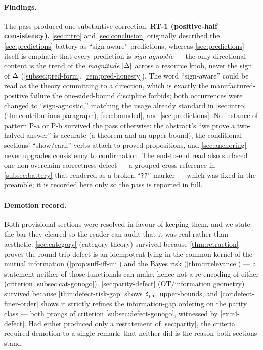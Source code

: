 \paragraph{Findings.}
The pass produced one substantive correction. \textbf{RT-1 (positive-half consistency).}
\cref{sec:intro} and \cref{sec:conclusion} originally described the
\cref{sec:predictions} battery as ``sign-aware'' predictions, whereas
\cref{sec:predictions} itself is emphatic that every prediction is
\emph{sign-agnostic} --- the only directional content is the trend of the
\emph{magnitude} $|\Delta|$ across a resource knob, never the sign of
$\Delta$ (\cref{subsec:pred-form}, \cref{rem:pred-honesty}). The word
``sign-aware'' could be read as the theory committing to a direction, which is
exactly the manufactured-positive failure the one-sided-bound discipline forbids; both occurrences were
changed to ``sign-agnostic,'' matching the usage already standard in
\cref{sec:intro} (the contributions paragraph), \cref{sec:bounded}, and
\cref{sec:predictions}. No instance of pattern P-a or P-b survived the pass
otherwise: the abstract's ``we prove a two-halved answer'' is accurate (a
theorem and an upper bound), the conditional sections' ``show/earn'' verbs attach to
proved propositions, and \cref{sec:anchoring} never upgrades consistency to
confirmation. The end-to-end read also surfaced one non-overclaim correctness
defect --- a grouped cross-reference in \cref{subsec:battery} that rendered as a
broken ``\texttt{??}'' marker --- which was fixed in the preamble; it is recorded
here only so the pass is reported in full.

\paragraph{Demotion record.}
Both provisional sections were resolved in favour of keeping them, and we state
the bar they cleared so the reader can audit that it was real rather than
aesthetic. \cref{sec:category} (category theory) survived because
\cref{thm:retraction} proves the round-trip defect is an idempotent lying in the
common kernel of the mutual information (\cref{prop:suff-iff-mi}) and the Bayes
risk (\cref{thm:irrelevance}) --- a statement neither of those functionals can
make, hence not a re-encoding of either (criterion \cref{subsec:cat-gonogo}).
\cref{sec:parity-defect} (OT/information geometry) survived because
\cref{thm:defect-risk-gap} shows $\delta_{\mathrm{par}}$ upper-bounds, and
\cref{cor:defect-finer-order} shows it strictly refines the information-gap
ordering on the parity class --- both prongs of criterion
\cref{subsec:defect-gonogo}, witnessed by \cref{ex:r4-defect}.
Had either produced only a restatement of \cref{sec:parity}, the criteria
required demotion to a single remark; that neither did is the reason both
sections stand.

